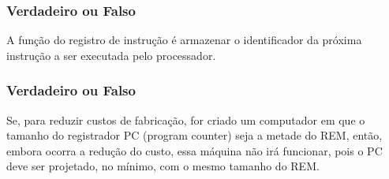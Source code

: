 \documentclass[aspectratio=169,
				xcolor=table]{beamer}
\begin{document}
	\begin{frame}
		\frametitle{Verdadeiro ou Falso}
		A função do registro de instrução é armazenar o identificador da próxima instrução a ser executada pelo processador.
	\end{frame}
	
	\begin{frame}
		\frametitle{Verdadeiro ou Falso}
		Se, para reduzir custos de fabricação, for criado um computador em que o tamanho do registrador PC (program counter) seja a metade do REM, então, embora ocorra a redução do custo, essa máquina não irá funcionar, pois o PC deve ser projetado, no mínimo, com o mesmo tamanho do REM.
	\end{frame}

%
%	
%	
%			
\end{document}
